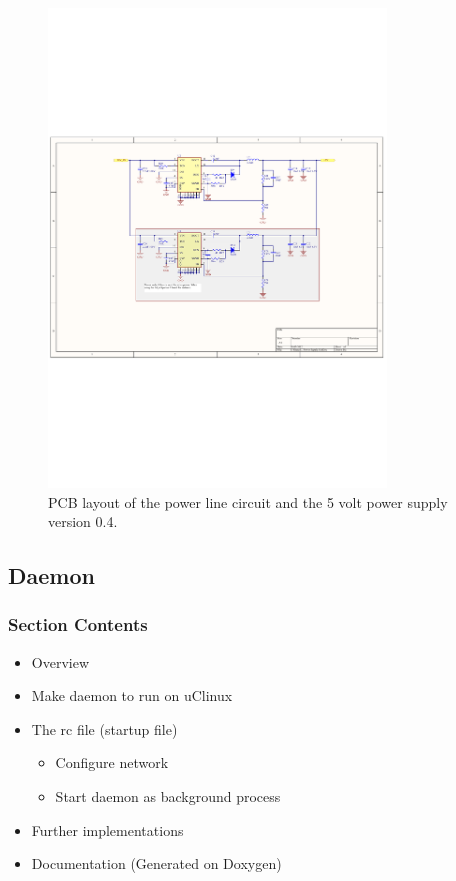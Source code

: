 \begin{figure}[H]
	\begin{centering}
		 \includegraphics[width=0.8\textwidth,page=3,angle=0]{images/SIG60_v0_4}
		\caption{PCB layout of the power line circuit and the 5 volt power supply version 0.4.}
	\end{centering}
\end{figure}


\subsection{Daemon}
\subsubsection{Section Contents}
\begin{itemize}
	\item Overview
	\item Make daemon to run on uClinux
	\item The rc file (startup file)
	\begin{itemize}
		\item Configure network
		\item Start daemon as background process
	\end{itemize}
	\item Further implementations
	\item Documentation (Generated on Doxygen)
\end{itemize}

